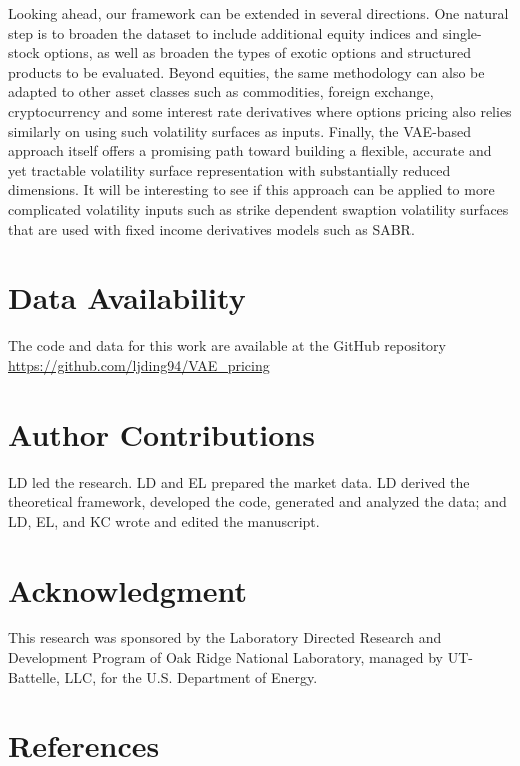 \documentclass[%
 reprint,
 superscriptaddress,
nobibnotes,
 amsmath,amssymb,
 aip,
]{revtex4-2}
\begin{document}
Looking ahead, our framework can be extended in several directions. One natural step is to broaden the dataset to include additional equity indices and single-stock options, as well as broaden the types of exotic options and structured products to be evaluated. Beyond equities, the same methodology can also be adapted to other asset classes such as commodities, foreign exchange, cryptocurrency and some interest rate derivatives where options pricing also relies similarly on using such volatility surfaces as inputs. Finally, the VAE-based approach itself offers a promising path toward building a flexible, accurate and yet tractable volatility surface representation with substantially reduced dimensions\cite{ning2023arbitrage,wang2025controllable,kelly2023deep}. It will be interesting to see if this approach can be applied to more complicated volatility inputs such as strike dependent swaption volatility surfaces\cite{fan2003hedging} that are used with fixed income derivatives models such as SABR\cite{hagan2015probability}. 

\section*{Data Availability}
The code and data for this work are available at the GitHub repository \url{https://github.com/ljding94/VAE_pricing}

\section*{Author Contributions}
LD led the research. LD and EL prepared the market data. LD derived the theoretical framework, developed the code, generated and analyzed the data; and LD, EL, and KC wrote and edited the manuscript.

\section*{Acknowledgment}
This research was sponsored by the Laboratory Directed Research and Development Program of Oak Ridge National Laboratory, managed by UT-Battelle, LLC, for the U.S. Department of Energy.


\section*{References}

\onecolumngrid
\clearpage
\appendix
\end{document}
